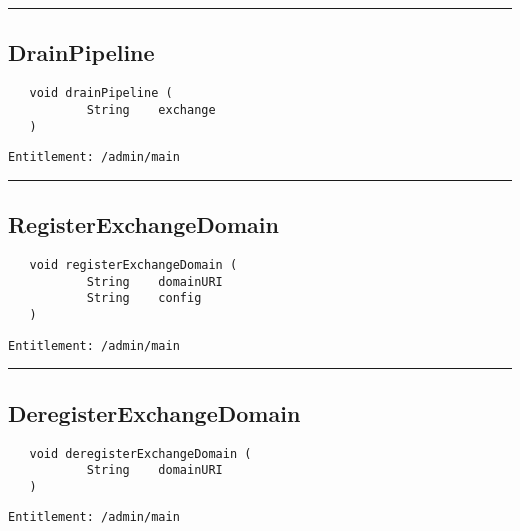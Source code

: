 \rule{12cm}{2pt}
\subsection{DrainPipeline}
\label{Api:DrainPipeline}
\begin{Verbatim}
   void drainPipeline (
           String    exchange
   )
\end{Verbatim}
\begin{Verbatim}[formatcom=\color{Maroon}]
  Entitlement: /admin/main
\end{Verbatim}



\rule{12cm}{2pt}
\subsection{RegisterExchangeDomain}
\label{Api:RegisterExchangeDomain}
\begin{Verbatim}
   void registerExchangeDomain (
           String    domainURI
           String    config
   )
\end{Verbatim}
\begin{Verbatim}[formatcom=\color{Maroon}]
  Entitlement: /admin/main
\end{Verbatim}



\rule{12cm}{2pt}
\subsection{DeregisterExchangeDomain}
\label{Api:DeregisterExchangeDomain}
\begin{Verbatim}
   void deregisterExchangeDomain (
           String    domainURI
   )
\end{Verbatim}
\begin{Verbatim}[formatcom=\color{Maroon}]
  Entitlement: /admin/main
\end{Verbatim}




